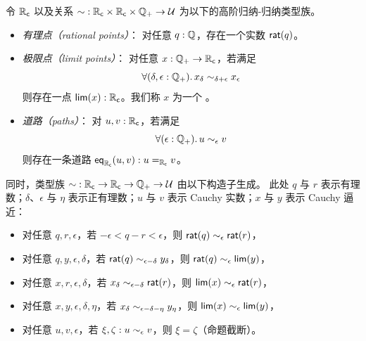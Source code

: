 \begin{defn}\label{defn:cauchy-reals}
  令 $\RC$ 以及关系 $\closesym:\RC \times \RC \times \Qp \to \type$ 为以下的高阶归纳-归纳类型族。
  \begin{itemize}
  \item \emph{有理点（rational points）}：
    对任意 $q : \Q$，存在一个实数 $\rcrat(q)$。
  \item \emph{极限点（limit points）}：
    对任意 $x : \Qp \to \RC$，若满足
    \begin{equation}
      \label{eq:RC-cauchy}
      \fall{\delta, \epsilon : \Qp} x_\delta \close{\delta + \epsilon} x_\epsilon
    \end{equation}
    则存在一点 $\rclim(x) : \RC$。我们称 $x$ 为一个%
。%
  \item \emph{道路（paths）}：
    对 $u, v : \RC$，若满足
    \begin{equation}
      \label{eq:RC-path}
      \fall{\epsilon : \Qp} u \close\epsilon v
    \end{equation}
    则存在一条道路 $\rceq(u, v) : \id[\RC]{u}{v}$。
  \end{itemize}
  同时，类型族 $\closesym:\RC\to\RC\to\Qp \to\type$ 由以下构造子生成。
  此处 $q$ 与 $r$ 表示有理数；$\delta$、$\epsilon$ 与 $\eta$ 表示正有理数；$u$ 与 $v$ 表示 Cauchy 实数；$x$ 与 $y$ 表示 Cauchy 逼近：
  \begin{itemize}
  \item 对任意 $q,r,\epsilon$，若 $-\epsilon < q - r < \epsilon$，则 $\rcrat(q) \close\epsilon \rcrat(r)$，
  \item 对任意 $q,y,\epsilon,\delta$，若 $\rcrat(q) \close{\epsilon - \delta} y_\delta$，则 $\rcrat(q) \close{\epsilon} \rclim(y)$，
  \item 对任意 $x,r,\epsilon,\delta$，若 $x_\delta \close{\epsilon - \delta} \rcrat(r)$，则 $\rclim(x) \close\epsilon \rcrat(r)$，
  \item 对任意 $x,y,\epsilon,\delta,\eta$，若 $x_\delta \close{\epsilon - \delta - \eta} y_\eta$，则 $\rclim(x) \close\epsilon \rclim(y)$，
  \item 对任意 $u,v,\epsilon$，若 $\xi,\zeta : u \close{\epsilon} v$，则 $\xi=\zeta$（命题截断）。
  \end{itemize}
\end{defn}

